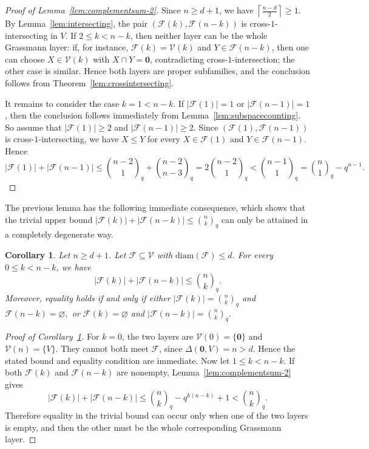 \documentclass[11pt]{article}
\newtheorem{cor}[theorem]{Corollary}
\theoremstyle{definition}
\newcommand{\qbinom}[2]{\genfrac{(}{)}{0pt}{}{#1}{#2}_q}
\newcommand{\diam}{\mathrm{diam}}
\begin{document}
\begin{proof}[Proof of Lemma~\ref{lem:complementsum-2}]
Since $n\ge d+1$, we have
\(
\left\lceil \frac{n-d}{2}\right\rceil \ge 1.
\)
By Lemma~\ref{lem:intersecting}, the pair $(\mathcal{F}(k),\mathcal{F}(n-k))$ is cross-$1$-intersecting in $V$. If \(2\le k<n-k\), then neither layer can be the whole Grassmann layer: if, for instance, \(\mathcal F(k)=\mathcal V(k)\) and \(Y\in\mathcal F(n-k)\), then one can choose \(X\in\mathcal V(k)\) with \(X\cap Y= \boldsymbol 0 \), contradicting cross-$1$-intersection; the other case is similar. Hence both layers are proper subfamilies, and the conclusion follows from Theorem~\ref{lem:crossintersecting}.


It remains to consider the case $k=1<n-k$. 
If $|\mathcal{F}(1)|=1$ or $|\mathcal{F}(n-1)|=1$, then the conclusion follows immediately from Lemma~\ref{lem:subspacecounting}.
So assume that $|\mathcal{F}(1)|\ge 2$ and $|\mathcal{F}(n-1)|\ge 2$. 
Since $(\mathcal{F}(1),\mathcal{F}(n-1))$ is cross-$1$-intersecting, we have $X\le Y$ for every $X\in \mathcal{F}(1)$ and $Y\in \mathcal{F}(n-1)$. Hence
\[
|\mathcal{F}(1)|+|\mathcal{F}(n-1)|
\le
\qbinom{n-2}{1}+\qbinom{n-2}{n-3}
=
2\qbinom{n-2}{1}
<
\qbinom{n-1}{1}
=
\qbinom{n}{1}-q^{n-1}.
\]
\qedhere
\end{proof}

The previous lemma has the following immediate consequence, which shows that the trivial upper bound
\(
|\mathcal{F}(k)|+|\mathcal{F}(n-k)|\le \qbinom{n}{k}
\)
can only be attained in a completely degenerate way.

\begin{cor}\label{lem:complementsum-1}
Let $n\ge d+1$. Let $\mathcal{F} \subseteq \mathcal{V}$ with $\diam(\mathcal{F}) \le d$. For every $0\le k<n-k$, we have
\[
|\mathcal{F}(k)|+|\mathcal{F}(n-k)|
\le
\qbinom{n}{k}.
\]
Moreover, equality holds if and only if either
\(
|\mathcal{F}(k)|=\qbinom{n}{k}\)
and
\(
\mathcal{F}(n-k)=\varnothing,
\)
or
\(
\mathcal{F}(k)=\varnothing\)
and \(
|\mathcal{F}(n-k)|=\qbinom{n}{k}.
\)
\end{cor}
\begin{proof}[Proof of Corollary~\ref{lem:complementsum-1}]
For \(k=0\), the two layers are \(\mathcal V(0)=\{\boldsymbol 0\}\) and \(\mathcal V(n)=\{V\}\). They cannot both meet \(\mathcal F\), since \(\Delta(\boldsymbol 0,V)=n>d\). Hence the stated bound and equality condition are immediate. Now let \(1\le k<n-k\). If both \(\mathcal F(k)\) and \(\mathcal F(n-k)\) are nonempty, Lemma~\ref{lem:complementsum-2} gives
\[
|\mathcal F(k)|+|\mathcal F(n-k)|
\le \qbinom nk-q^{k(n-k)}+1
<\qbinom nk.
\]
Therefore equality in the trivial bound can occur only when one of the two layers is empty, and then the other must be the whole corresponding Grassmann layer.
\end{proof}
\end{document}
